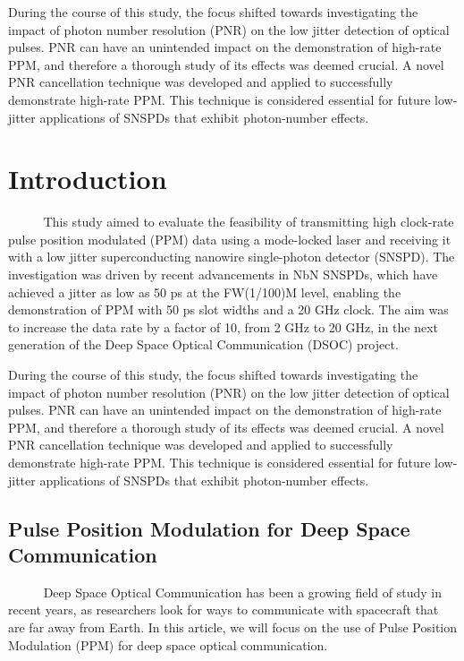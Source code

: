 \documentclass[12pt]{caltech_thesis}
\begin{document}
During the course of this study, the focus shifted towards investigating
the impact of photon number resolution (PNR) on the low jitter detection
of optical pulses. PNR can have an unintended impact on the
demonstration of high-rate PPM, and therefore a thorough study of its
effects was deemed crucial. A novel PNR cancellation technique was
developed and applied to successfully demonstrate high-rate PPM. This
technique is considered essential for future low-jitter applications of
SNSPDs that exhibit photon-number effects.

\hypertarget{introduction-1}{%
\section{Introduction}\label{introduction-1}}

~~~~~ This study aimed to evaluate the feasibility of transmitting high
clock-rate pulse position modulated (PPM) data using a mode-locked laser
and receiving it with a low jitter superconducting nanowire
single-photon detector (SNSPD). The investigation was driven by recent
advancements in NbN SNSPDs, which have achieved a jitter as low as 50 ps
at the FW(1/100)M level, enabling the demonstration of PPM with 50 ps
slot widths and a 20 GHz clock. The aim was to increase the data rate by
a factor of 10, from 2 GHz to 20 GHz, in the next generation of the Deep
Space Optical Communication (DSOC) project.

During the course of this study, the focus shifted towards investigating
the impact of photon number resolution (PNR) on the low jitter detection
of optical pulses. PNR can have an unintended impact on the
demonstration of high-rate PPM, and therefore a thorough study of its
effects was deemed crucial. A novel PNR cancellation technique was
developed and applied to successfully demonstrate high-rate PPM. This
technique is considered essential for future low-jitter applications of
SNSPDs that exhibit photon-number effects.

\hypertarget{pulse-position-modulation-for-deep-space-communication}{%
\subsection{Pulse Position Modulation for Deep Space
Communication}\label{pulse-position-modulation-for-deep-space-communication}}

~~~~~ Deep Space Optical Communication has been a growing field of study
in recent years, as researchers look for ways to communicate with
spacecraft that are far away from Earth. In this article, we will focus
on the use of Pulse Position Modulation (PPM) for deep space optical
communication.
\end{document}

